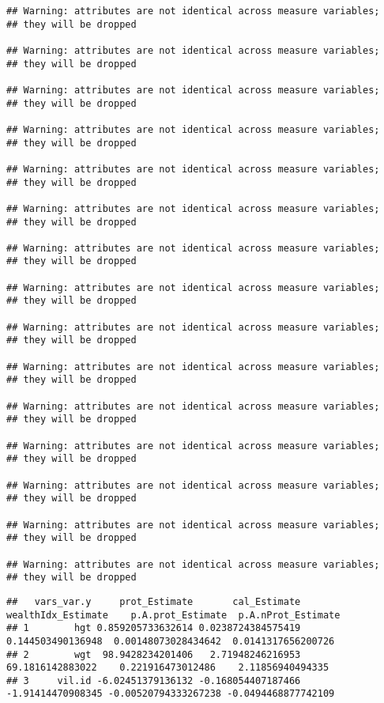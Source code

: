\documentclass[
]{book}
\begin{document}
\begin{verbatim}
## Warning: attributes are not identical across measure variables;
## they will be dropped

## Warning: attributes are not identical across measure variables;
## they will be dropped

## Warning: attributes are not identical across measure variables;
## they will be dropped

## Warning: attributes are not identical across measure variables;
## they will be dropped

## Warning: attributes are not identical across measure variables;
## they will be dropped

## Warning: attributes are not identical across measure variables;
## they will be dropped

## Warning: attributes are not identical across measure variables;
## they will be dropped

## Warning: attributes are not identical across measure variables;
## they will be dropped

## Warning: attributes are not identical across measure variables;
## they will be dropped

## Warning: attributes are not identical across measure variables;
## they will be dropped

## Warning: attributes are not identical across measure variables;
## they will be dropped

## Warning: attributes are not identical across measure variables;
## they will be dropped

## Warning: attributes are not identical across measure variables;
## they will be dropped

## Warning: attributes are not identical across measure variables;
## they will be dropped

## Warning: attributes are not identical across measure variables;
## they will be dropped
\end{verbatim}

\begin{verbatim}
##   vars_var.y     prot_Estimate       cal_Estimate wealthIdx_Estimate    p.A.prot_Estimate  p.A.nProt_Estimate
## 1        hgt 0.859205733632614 0.0238724384575419  0.144503490136948  0.00148073028434642  0.0141317656200726
## 2        wgt  98.9428234201406   2.71948246216953   69.1816142883022    0.221916473012486    2.11856940494335
## 3     vil.id -6.02451379136132 -0.168054407187466  -1.91414470908345 -0.00520794333267238 -0.0494468877742109
\end{verbatim}
\end{document}

